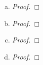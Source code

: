 \begin{itemize}
\begin{enumerate}[(a)]
\begin{proof}
\end{proof}


\item 
\begin{proof}

\end{proof}

\item 
\begin{proof}
        
\end{proof}


\item 
\begin{proof}

\end{proof}


\item 
\begin{proof}

\end{proof}
\end{enumerate}





























\end{itemize}